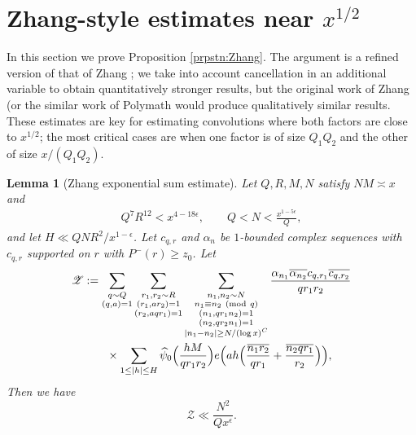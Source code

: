 \documentclass[10pt]{amsart}
\theoremstyle{plain}
\newtheorem{lmm}[thrm]{Lemma}
\numberwithin{equation}{section}
\newcommand{\Mod}[1]{\ (\mathrm{mod}\ #1)}
\renewcommand{\hat}[1]{\widehat #1}
\begin{document}
\section{Zhang-style estimates near \texorpdfstring{$x^{1/2}$}{x\^{}(1/2)}}\label{sec:Zhang}
%
%
%
%
In this section we prove Proposition \ref{prpstn:Zhang}. The argument is a refined version of that of Zhang \cite{Zhang}; we take into account cancellation in an additional variable to obtain quantitatively stronger results, but the original work of Zhang (or the similar work of Polymath \cite{Polymath} would produce qualitatively similar results. These estimates are key for estimating convolutions where both factors are close to $x^{1/2}$; the most critical cases are when one factor is of size $Q_1Q_2$ and the other of size $x/(Q_1Q_2)$.
%
%
%
%
%
%
%
%
\begin{lmm}[Zhang exponential sum estimate]\label{lmm:Zhang1}
Let $Q,R,M,N$ satisfy $NM\asymp x$ and
\begin{align*}
Q^{7} R^{12}< x^{4-18\epsilon},\qquad 
Q <N<\frac{x^{1-5\epsilon}}{Q},
\end{align*}
and let  $H\ll QNR^2/x^{1-\epsilon}$. Let $c_{q,r}$ and $\alpha_n$ be $1$-bounded complex sequences with $c_{q,r}$ supported on $r$ with $P^-(r)\ge z_0$. Let
\begin{align*}
\mathscr{Z}&:=\sum_{\substack{q\sim Q\\ (q,a)=1}}\sum_{\substack{r_1,r_2\sim R\\ (r_1,ar_2)=1\\ (r_2,aqr_1)=1}}\sum_{\substack{n_1,n_2\sim N\\ n_1\equiv n_2\Mod{q}\\ (n_1,q r_ 1 n_2)=1\\ (n_2,q r_2 n_1)=1\\ |n_1-n_2|\ge N/(\log{x})^C}}\frac{\alpha_{n_1}\overline{\alpha_{n_2}}c_{q,r_1}\overline{c_{q,r_2}}}{q r_1 r_2}\\
&\qquad\times \sum_{1\le |h|\le H}\hat{\psi_0}\Bigl(\frac{h M}{q r_1 r_2}\Bigr)e\Bigl(ah\Bigl(\frac{\overline{n_1 r_2}}{qr_1}+\frac{\overline{n_2 q r_1}}{r_2}\Bigr)\Bigr),
\end{align*}
Then we have
\[
\mathscr{Z}\ll \frac{N^2 }{Q x^\epsilon}.
\]
\end{lmm}
%
%
%
%
\end{document}
